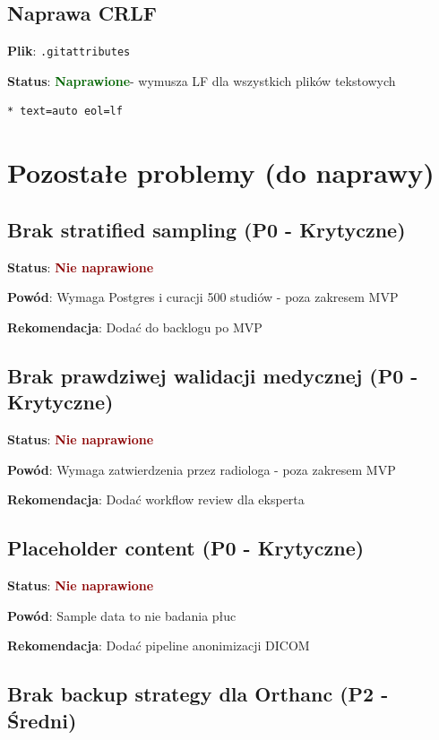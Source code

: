 \documentclass[a4paper,12pt]{article}
\newcommand{\statusok}{\textcolor{darkgreen}{\textbf{Naprawione}}}
\newcommand{\statusfail}{\textcolor{darkred}{\textbf{Nie naprawione}}}
\begin{document}
\subsection{Naprawa CRLF}

\textbf{Plik}: \texttt{.gitattributes}

\textbf{Status}: \statusok - wymusza LF dla wszystkich plików tekstowych

\begin{lstlisting}[caption=Konfiguracja .gitattributes]
* text=auto eol=lf
\end{lstlisting}

\section{Pozostałe problemy (do naprawy)}

\subsection{Brak stratified sampling (P0 - Krytyczne)}

\textbf{Status}: \statusfail

\textbf{Powód}: Wymaga Postgres i curacji 500 studiów - poza zakresem MVP

\textbf{Rekomendacja}: Dodać do backlogu po MVP

\subsection{Brak prawdziwej walidacji medycznej (P0 - Krytyczne)}

\textbf{Status}: \statusfail

\textbf{Powód}: Wymaga zatwierdzenia przez radiologa - poza zakresem MVP

\textbf{Rekomendacja}: Dodać workflow review dla eksperta

\subsection{Placeholder content (P0 - Krytyczne)}

\textbf{Status}: \statusfail

\textbf{Powód}: Sample data to nie badania płuc

\textbf{Rekomendacja}: Dodać pipeline anonimizacji DICOM

\subsection{Brak backup strategy dla Orthanc (P2 - Średni)}
\end{document}
